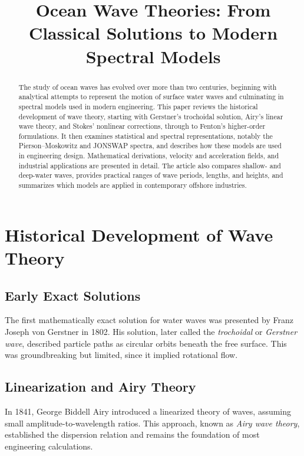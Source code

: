 \documentclass[11pt,a4paper]{article}
\title{Ocean Wave Theories: From Classical Solutions to Modern Spectral Models}
\author{}
\date{}
\begin{document}
\maketitle

\begin{abstract}
The study of ocean waves has evolved over more than two centuries, beginning with analytical attempts to represent the motion of surface water waves and culminating in spectral models used in modern engineering. This paper reviews the historical development of wave theory, starting with Gerstner's trochoidal solution, Airy's linear wave theory, and Stokes' nonlinear corrections, through to Fenton’s higher-order formulations. It then examines statistical and spectral representations, notably the Pierson–Moskowitz and JONSWAP spectra, and describes how these models are used in engineering design. Mathematical derivations, velocity and acceleration fields, and industrial applications are presented in detail. The article also compares shallow- and deep-water waves, provides practical ranges of wave periods, lengths, and heights, and summarizes which models are applied in contemporary offshore industries.
\end{abstract}

\tableofcontents

\section{Historical Development of Wave Theory}
\subsection{Early Exact Solutions}
The first mathematically exact solution for water waves was presented by Franz Joseph von Gerstner in 1802. His solution, later called the \emph{trochoidal} or \emph{Gerstner wave}, described particle paths as circular orbits beneath the free surface. This was groundbreaking but limited, since it implied rotational flow.

\subsection{Linearization and Airy Theory}
In 1841, George Biddell Airy introduced a linearized theory of waves, assuming small amplitude-to-wavelength ratios. This approach, known as \emph{Airy wave theory}, established the dispersion relation and remains the foundation of most engineering calculations.
\end{document}
